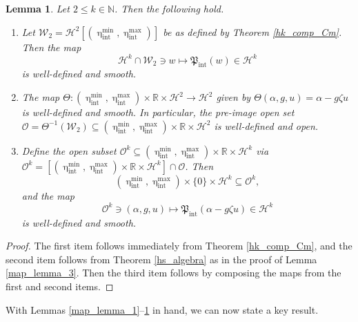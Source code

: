 \documentclass[11pt,reqno]{amsart}
\numberwithin{equation}{section}
\newcommand{\m}{\mathrm}
\def\pfint{\mathfrak{P}_{\m{int}}}
\def\hint{\upeta_{\m{int}}}
\def\h{\mathcal{H}}
\def\N{\mathbb{N}}
\def\R{\mathbb{R}}
\newtheorem{lem}{Lemma}[section]
\begin{document}
\begin{lem}\label{map_lemma_4}
Let $2 \le k \in \N$.  Then the following hold.
\begin{enumerate}
 \item  Let $\mathcal{W}_2 = \h^2[(\hint^{\m{min}}, \hint^{\m{max}})]$ be as defined by Theorem \ref{hk_comp_Cm}.  Then the map 
\begin{equation}
 \h^k \cap  \mathcal{W}_2 \ni w \mapsto \pfint(w) \in \h^k
\end{equation}
is well-defined and smooth.
 \item The map $\Theta : (\hint^{\m{min}}, \hint^{\m{max}}) \times \R \times \h^2 \to \h^2$ given by $\Theta(\alpha,g,u) = \alpha - g \zeta u$ is well-defined and smooth.  In particular, the pre-image open set $\mathcal{O} = \Theta^{-1}(\mathcal{W}_2) \subseteq (\hint^{\m{min}}, \hint^{\m{max}}) \times \R \times \h^2$ is well-defined and open.
  \item Define the open subset $\mathcal{O}^k \subseteq (\hint^{\m{min}}, \hint^{\m{max}}) \times \R \times \h^k$ via $\mathcal{O}^k = [(\hint^{\m{min}}, \hint^{\m{max}}) \times \R \times \h^k] \cap \mathcal{O}$.  Then 
\begin{equation}
 (\hint^{\m{min}}, \hint^{\m{max}}) \times \{0\} \times \h^{k} \subseteq \mathcal{O}^k,
\end{equation}
and the map 
\begin{equation}
 \mathcal{O}^k \ni (\alpha,g,u) \mapsto \pfint(\alpha - g\zeta u) \in \h^k 
\end{equation}
is well-defined and smooth.
\end{enumerate}
\end{lem}
\begin{proof}
The first item follows immediately from Theorem \ref{hk_comp_Cm}, and the second item follows from  Theorem \ref{hs_algebra} as in the proof of Lemma \ref{map_lemma_3}.  Then the third item follows by composing the maps from the first and second items.
\end{proof}

With Lemmas \ref{map_lemma_1}--\ref{map_lemma_4} in hand, we can now state a key result.
\end{document}
